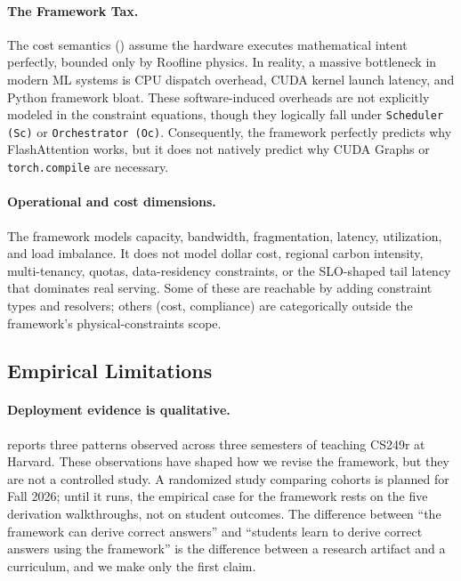 \documentclass[10pt,twocolumn]{article}
\begin{document}
\paragraph{The Framework Tax.} The cost semantics () assume the hardware executes mathematical intent perfectly, bounded only by Roofline physics. In reality, a massive bottleneck in modern ML systems is CPU dispatch overhead, CUDA kernel launch latency, and Python framework bloat. These software-induced overheads are not explicitly modeled in the constraint equations, though they logically fall under \texttt{Scheduler (Sc)} or \texttt{Orchestrator (Oc)}. Consequently, the framework perfectly predicts why FlashAttention works, but it does not natively predict why CUDA Graphs or \texttt{torch.compile} are necessary.

\paragraph{Operational and cost dimensions.} The framework models capacity, bandwidth, fragmentation, latency, utilization, and load imbalance. It does not model dollar cost, regional carbon intensity, multi-tenancy, quotas, data-residency constraints, or the SLO-shaped tail latency that dominates real serving. Some of these are reachable by adding constraint types and resolvers; others (cost, compliance) are categorically outside the framework's physical-constraints scope.

\subsection{Empirical Limitations}

\paragraph{Deployment evidence is qualitative.}  reports three patterns observed across three semesters of teaching CS249r at Harvard. These observations have shaped how we revise the framework, but they are not a controlled study. A randomized study comparing cohorts is planned for Fall 2026; until it runs, the empirical case for the framework rests on the five derivation walkthroughs, not on student outcomes. The difference between ``the framework can derive correct answers'' and ``students learn to derive correct answers using the framework'' is the difference between a research artifact and a curriculum, and we make only the first claim.
\end{document}
